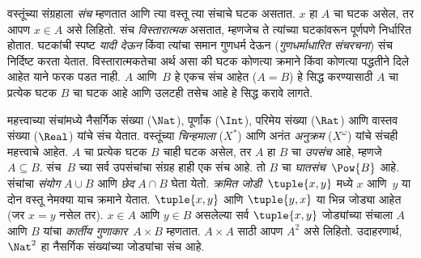 वस्तूंच्या संग्रहाला \emph{संच} म्हणतात आणि त्या वस्तू त्या संचाचे घटक असतात. $x$ हा $A$ चा घटक असेल, तर आपण $x \in A$ असे लिहितो. संच \emph{विस्तारात्मक} असतात, म्हणजेच ते त्यांच्या घटकांवरून पूर्णपणे निर्धारित होतात. घटकांची स्पष्ट \emph{यादी देऊन} किंवा त्यांचा समान गुणधर्म देऊन (\emph{गुणधर्माधारित संचरचना}) संच निर्दिष्ट करता येतात. विस्तारात्मकतेचा अर्थ असा की घटक कोणत्या क्रमाने किंवा कोणत्या पद्धतीने दिले आहेत याने फरक पडत नाही. $A$ आणि~$B$ हे एकच संच आहेत ($A = B$) हे सिद्ध करण्यासाठी $A$ चा प्रत्येक घटक $B$ चा घटक आहे आणि उलटही तसेच आहे हे सिद्ध करावे लागते.

महत्त्वाच्या संचांमध्ये नैसर्गिक संख्या ($\Nat$), पूर्णांक ($\Int$), परिमेय संख्या ($\Rat$) आणि वास्तव संख्या ($\Real$) यांचे संच येतात. वस्तूंच्या \emph{चिन्हमाला} ($X^*$) आणि अनंत \emph{अनुक्रम} ($X^\omega$) यांचे संचही महत्त्वाचे आहेत. $A$ चा प्रत्येक घटक $B$ चाही घटक असेल, तर $A$ हा $B$ चा \emph{उपसंच} आहे, म्हणजे $A \subseteq B$. संच~$B$ च्या सर्व उपसंचांचा संग्रह हाही एक संच आहे. तो $B$ चा \emph{घातसंच}~$\Pow{B}$ आहे. संचांचा \emph{संयोग} $A \cup B$ आणि \emph{छेद} $A \cap B$ घेता येतो. \emph{क्रमित जोडी}~$\tuple{x, y}$ मध्ये $x$ आणि~$y$ या दोन वस्तू नेमक्या याच क्रमाने येतात. $\tuple{x, y}$ आणि $\tuple{y, x}$ या भिन्न जोड्या आहेत (जर $x = y$ नसेल तर). $x \in A$ आणि $y \in B$ असलेल्या सर्व $\tuple{x, y}$ जोड्यांच्या संचाला $A$ आणि $B$ यांचा \emph{कार्तीय गुणाकार}~$A \times B$ म्हणतात. $A \times A$ साठी आपण $A^2$ असे लिहितो. उदाहरणार्थ, $\Nat^2$ हा नैसर्गिक संख्यांच्या जोड्यांचा संच आहे.
